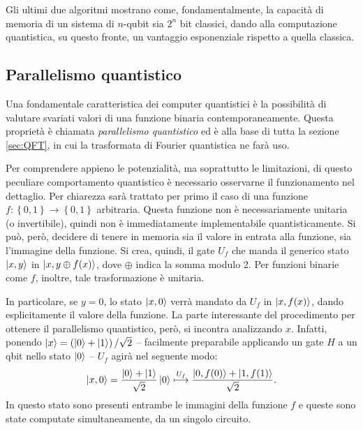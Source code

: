 Gli ultimi due algoritmi mostrano come, fondamentalmente, la capacità di memoria di un sistema di $n$-qubit sia $2^n$ bit classici, dando alla computazione quantistica, su questo fronte, un vantaggio esponenziale rispetto a quella classica.

\subsection{Parallelismo quantistico}\label{sec:Quantum_par}
Una fondamentale caratteristica dei computer quantistici è la possibilità di valutare svariati valori di una funzione binaria contemporaneamente. Questa proprietà è chiamata \textit{parallelismo quantistico} ed è alla base di tutta la sezione \ref{sec:QFT}, in cui la trasformata di Fourier quantistica ne farà uso.

Per comprendere appieno le potenzialità, ma soprattutto le limitazioni, di questo peculiare comportamento quantistico è necessario osservarne il funzionamento nel dettaglio.
Per chiarezza sarà trattato per primo il caso di una funzione $f:\left\{ 0,1 \right\} \to \left\{ 0,1 \right\}$ arbitraria.
Questa funzione non è necessariamente unitaria (o invertibile), quindi non è immediatamente implementabile quantisticamente.
Si può, però, decidere di tenere in memoria sia il valore in entrata alla funzione, sia l'immagine della funzione.
Si crea, quindi, il gate $U_f$ che manda il generico stato $\ket{x,y}$ in $\ket{x,y \oplus f(x)}$, dove $\oplus$ indica la somma modulo 2. Per funzioni binarie come $f$, inoltre, tale trasformazione è unitaria.

In particolare, se $y=0$, lo stato $\ket{x,0}$ verrà mandato da $U_f$ in $\ket{x, f(x)}$, dando esplicitamente il valore della funzione. La parte interessante del procedimento per ottenere il parallelismo quantistico, però, si incontra analizzando $x$.
Infatti, ponendo $\ket{x} = \left(\ket{0} + \ket{1} \right)/\sqrt{2}$ -- facilmente preparabile applicando un gate $H$ a un qbit nello stato $\ket{0}$ -- $U_f$ agirà nel seguente modo:
\begin{equation}
 \ket{x,0} = \frac{\ket{0} + \ket{1}}{\sqrt{2}}\ket{0} \stackrel{U_f}{\longmapsto} \frac{\ket{0,f(0)} + \ket{1,f(1)}}{\sqrt{2}}.
\end{equation}
In questo stato sono presenti entrambe le immagini della funzione $f$ e queste sono state computate simultaneamente, da un singolo circuito.

